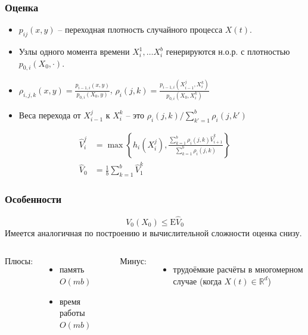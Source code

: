 \documentclass[unicode, notheorems]{beamer}
\newcommand{\E}{\mathrm{E}}
\newcommand{\R}{\ensuremath{\mathbb{R}}}
\newcommand{\Vhat}{\hat{V}}
\newcommand{\maxset}[1]{\max\left\lbrace#1\right\rbrace}
\begin{document}
		\begin{frame}
		\frametitle{Оценка} 
			\begin{itemize}
				\item $p_{ij}(x, y)$ -- переходная плотность случайного процесса $X(t)$.
				\item Узлы одного момента времени $X^1_i, \ldots X^b_i$ генерируются н.о.р. с плотностью $p_{0,i}(X_0, \cdot)$.
				\item $\rho_{i,j,k}(x, y) = \frac{p_{i-1,i}(x, y)}{p_{0,i}(X_0, y)}$, $\rho_i(j, k) = \frac{p_{i-1,i}(X_{i-1}^j, X_i^k)}{p_{0,i}(X_0, X_i^k)}$
				\item Веса перехода от $X_{i-1}^j$ к $X_i^k$ -- это $\rho_i(j, k) / \sum_{k'=1}^b \rho_i(j, k')$
			\end{itemize}
			\begin{align*}
				\Vhat_i^j &= \maxset{h_i\left(X_i^j\right), \frac{\sum_{k=1}^b \rho_i(j, k) \Vhat_{i+1}^k}{\sum_{k=1}^b \rho_i(j, k)}}\\
				\Vhat_0 &= \frac{1}{b}\sum_{k=1}^b \Vhat_1^k
			\end{align*}
		\end{frame}

		\begin{frame}
		\frametitle{Особенности}
			$$V_0(X_0) \leq \E\Vhat_0$$
			Имеется аналогичная по построению и вычислительной сложности оценка снизу.\\[.2cm]
			\begin{columns}[T]
				Плюсы:
				\begin{itemize}
					\item память $O(mb)$
					\item время работы $O(mb)$
				\end{itemize}
				Минус:
				\begin{itemize}
					\item трудоёмкие расчёты в многомерном случае (когда $X(t)\in\R^d$)
				\end{itemize}
			\end{columns}
		\end{frame}
\end{document}
